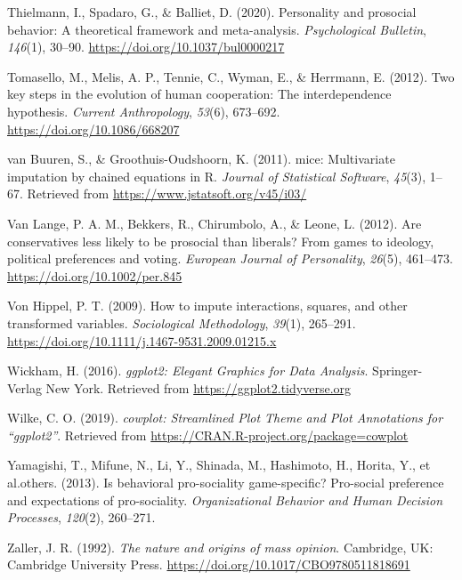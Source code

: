 \documentclass[
  man,floatsintext]{apa6}
\newlength{\cslhangindent}
\newlength{\cslentryspacingunit} %
\newenvironment{CSLReferences}[2] %
 {%
  \setlength{\parindent}{0pt}
  \ifodd #1
  \let\oldpar\par
  \def\par{\hangindent=\cslhangindent\oldpar}
  \fi
  \setlength{\parskip}{#2\cslentryspacingunit}
 }%
 {}
\begin{document}
\begin{CSLReferences}{1}{0}
\leavevmode{}%
Thielmann, I., Spadaro, G., \& Balliet, D. (2020). Personality and prosocial behavior: A theoretical framework and meta-analysis. \emph{Psychological Bulletin}, \emph{146}(1), 30--90. \url{https://doi.org/10.1037/bul0000217}

\leavevmode{}%
Tomasello, M., Melis, A. P., Tennie, C., Wyman, E., \& Herrmann, E. (2012). Two key steps in the evolution of human cooperation: The interdependence hypothesis. \emph{Current Anthropology}, \emph{53}(6), 673--692. \url{https://doi.org/10.1086/668207}

\leavevmode{}%
van Buuren, S., \& Groothuis-Oudshoorn, K. (2011). {mice}: Multivariate imputation by chained equations in {R}. \emph{Journal of Statistical Software}, \emph{45}(3), 1--67. Retrieved from \url{https://www.jstatsoft.org/v45/i03/}

\leavevmode{}%
Van Lange, P. A. M., Bekkers, R., Chirumbolo, A., \& Leone, L. (2012). Are conservatives less likely to be prosocial than liberals? From games to ideology, political preferences and voting. \emph{European Journal of Personality}, \emph{26}(5), 461--473. \url{https://doi.org/10.1002/per.845}

\leavevmode{}%
Von Hippel, P. T. (2009). How to impute interactions, squares, and other transformed variables. \emph{Sociological Methodology}, \emph{39}(1), 265--291. \url{https://doi.org/10.1111/j.1467-9531.2009.01215.x}

\leavevmode{}%
Wickham, H. (2016). \emph{{ggplot2: Elegant Graphics for Data Analysis}}. Springer-Verlag New York. Retrieved from \url{https://ggplot2.tidyverse.org}

\leavevmode{}%
Wilke, C. O. (2019). \emph{{cowplot: Streamlined Plot Theme and Plot Annotations for {``ggplot2''}}}. Retrieved from \url{https://CRAN.R-project.org/package=cowplot}

\leavevmode{}%
Yamagishi, T., Mifune, N., Li, Y., Shinada, M., Hashimoto, H., Horita, Y., et al.others. (2013). Is behavioral pro-sociality game-specific? Pro-social preference and expectations of pro-sociality. \emph{Organizational Behavior and Human Decision Processes}, \emph{120}(2), 260--271.

\leavevmode{}%
Zaller, J. R. (1992). \emph{The nature and origins of mass opinion}. Cambridge, UK: Cambridge University Press. \url{https://doi.org/10.1017/CBO9780511818691}

\end{CSLReferences}
\end{document}
